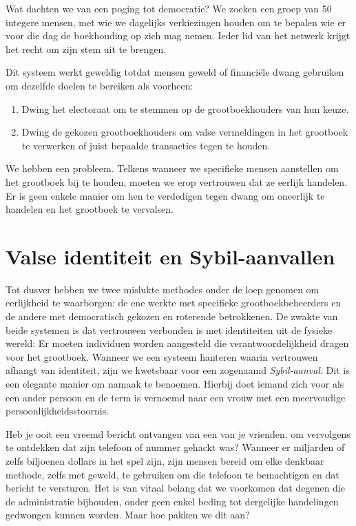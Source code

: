 Wat dachten we van een poging tot democratie? We zoeken een groep van 50 integere mensen, met wie we dagelijks verkiezingen houden om te bepalen wie er voor die dag de boekhouding op zich mag nemen. Ieder lid van het netwerk krijgt het recht om zijn stem uit te brengen.

Dit systeem werkt geweldig totdat mensen geweld of financiële dwang gebruiken om dezelfde doelen te bereiken als voorheen:

\clearpage
\begin{enumerate}
    \item Dwing het electoraat om te stemmen op de grootboekhouders van hun keuze.
    \item Dwing de gekozen grootboekhouders om valse vermeldingen in het grootboek te verwerken of juist bepaalde transacties tegen te houden.
\end{enumerate}

We hebben een probleem. Telkens wanneer we specifieke mensen aanstellen om het grootboek bij te houden, moeten we erop vertrouwen dat ze eerlijk handelen. Er is geen enkele manier om hen te verdedigen tegen dwang om oneerlijk te handelen en het grootboek te vervalsen.

\section{Valse identiteit en Sybil-aanvallen}

Tot dusver hebben we twee mislukte methodes onder de loep genomen om eerlijkheid te waarborgen: de ene werkte met specifieke grootboekbeheerders en de andere met democratisch gekozen en roterende betrokkenen. De zwakte van beide systemen is dat vertrouwen verbonden is met identiteiten uit de fysieke wereld: Er moeten individuen worden aangesteld die verantwoordelijkheid dragen voor het grootboek. Wanneer we een systeem hanteren waarin vertrouwen afhangt van identiteit, zijn we kwetsbaar voor een zogenaamd \textit{Sybil-aanval}. Dit is een elegante manier om namaak te benoemen. Hierbij doet iemand zich voor als een ander persoon en de term is vernoemd naar een vrouw met een meervoudige persoonlijkheidsstoornis.

Heb je ooit een vreemd bericht ontvangen van een van je vrienden, om vervolgens te ontdekken dat zijn telefoon of nummer gehackt was? Wanneer er miljarden of zelfs biljoenen dollars in het spel zijn, zijn mensen bereid om elke denkbaar methode, zelfs met geweld, te gebruiken om die telefoon te bemachtigen en dat bericht te versturen. Het is van vitaal belang dat we voorkomen dat degenen die de administratie bijhouden, onder geen enkel beding tot dergelijke handelingen gedwongen kunnen worden. Maar hoe pakken we dit aan?

